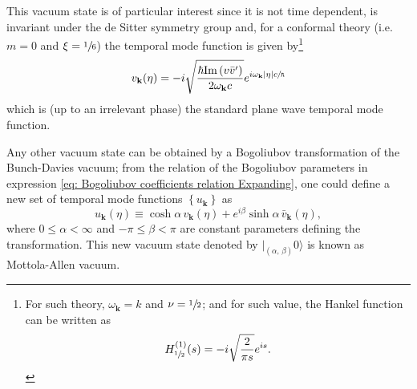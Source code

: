 This vacuum state is of particular interest since it is not time dependent, is invariant under the de Sitter symmetry group and, for a conformal theory (i.e. $m=0$ and $\xi=\sfrac{1}{6}$) the temporal mode function is given by\footnote{For such theory, $\omega_\mathbf{k}=k$ and $\nu=\sfrac{1}{2}$; and for such value, the Hankel function can be written as $$H^{(1)}_{\sfrac{1}{2}}(s)=-i\sqrt{\frac{2}{\pi s}}e^{is}.$$}
\begin{equation}
	v_\mathbf{k}(\eta)=-i\sqrt{\frac{\hbar\text{Im}\left( v\bar{v}'\right)}{ 2\omega_\mathbf{k}c}}e^{i\omega_\mathbf{k}|\eta|c\sfrac{}{\hbar}}
\end{equation}
which is (up to an irrelevant phase) the standard plane wave temporal mode function.

Any other vacuum state can be obtained by a Bogoliubov transformation of the Bunch-Davies vacuum; from the relation of the Bogoliubov parameters in expression \ref{eq: Bogoliubov coefficients relation Expanding}, one could define a new set of temporal mode functions $\left\{u_\mathbf{k}\right\}$ as
\begin{equation}
	u_\mathbf{k}(\eta)\equiv \cosh\alpha \,v_\mathbf{k}(\eta)+e^{i\beta}\sinh\alpha \,\bar{v}_\mathbf{k}(\eta),
\end{equation}
where $0\leq \alpha<\infty$ and $-\pi\leq\beta<\pi$ are constant parameters defining the transformation. This new vacuum state denoted by $|_{(\alpha,\,\beta)}0\rangle$ is known as Mottola-Allen vacuum.

